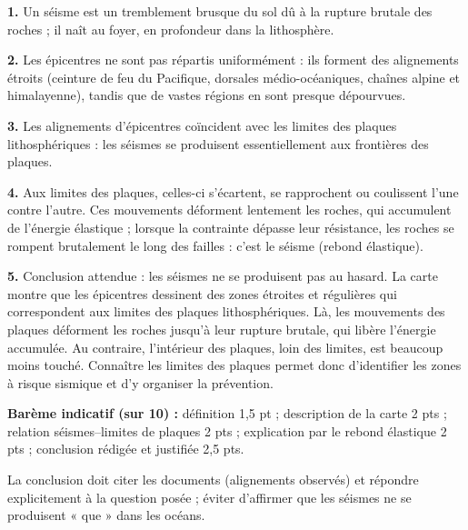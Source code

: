 \documentclass[11pt]{article}
\begin{document}
\begin{corrige}
\textbf{1.} Un séisme est un tremblement brusque du sol dû à la rupture brutale des roches ; il naît au foyer, en profondeur dans la lithosphère.

\textbf{2.} Les épicentres ne sont pas répartis uniformément : ils forment des alignements étroits (ceinture de feu du Pacifique, dorsales médio-océaniques, chaînes alpine et himalayenne), tandis que de vastes régions en sont presque dépourvues.

\textbf{3.} Les alignements d'épicentres coïncident avec les limites des plaques lithosphériques : les séismes se produisent essentiellement aux frontières des plaques.

\textbf{4.} Aux limites des plaques, celles-ci s'écartent, se rapprochent ou coulissent l'une contre l'autre. Ces mouvements déforment lentement les roches, qui accumulent de l'énergie élastique ; lorsque la contrainte dépasse leur résistance, les roches se rompent brutalement le long des failles : c'est le séisme (rebond élastique).

\textbf{5.} Conclusion attendue : les séismes ne se produisent pas au hasard. La carte montre que les épicentres dessinent des zones étroites et régulières qui correspondent aux limites des plaques lithosphériques. Là, les mouvements des plaques déforment les roches jusqu'à leur rupture brutale, qui libère l'énergie accumulée. Au contraire, l'intérieur des plaques, loin des limites, est beaucoup moins touché. Connaître les limites des plaques permet donc d'identifier les zones à risque sismique et d'y organiser la prévention.

\textbf{Barème indicatif (sur 10) :} définition 1,5 pt ; description de la carte 2 pts ; relation séismes--limites de plaques 2 pts ; explication par le rebond élastique 2 pts ; conclusion rédigée et justifiée 2,5 pts.

\begin{attention}
La conclusion doit citer les documents (alignements observés) et répondre explicitement à la question posée ; éviter d'affirmer que les séismes ne se produisent « que » dans les océans.
\end{attention}
\end{corrige}
\end{document}
